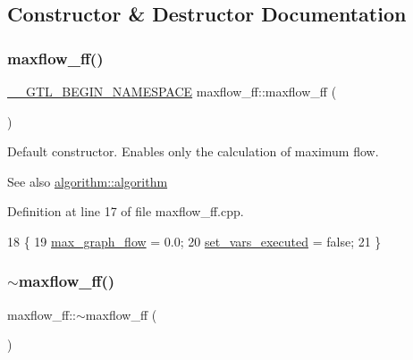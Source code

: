 \subsection{Constructor \& Destructor Documentation}
\mbox{\label{classmaxflow__ff_a6b1d3e5db46a8fcba81e94ad672926ec}} 
\subsubsection{\texorpdfstring{maxflow\+\_\+ff()}{maxflow\_ff()}}
{\footnotesize\ttfamily \mbox{\hyperlink{_g_t_l_8h_a2d9f24096ac60918452dd51f32b64aa9}{\+\_\+\+\_\+\+G\+T\+L\+\_\+\+B\+E\+G\+I\+N\+\_\+\+N\+A\+M\+E\+S\+P\+A\+CE}} maxflow\+\_\+ff\+::maxflow\+\_\+ff (\begin{DoxyParamCaption}{ }\end{DoxyParamCaption})}

Default constructor. Enables only the calculation of maximum flow.

\begin{DoxySeeAlso}{See also}
\mbox{\hyperlink{classalgorithm_ab79e1ddec2f2afdf4b36b10724db8b15}{algorithm\+::algorithm}} 
\end{DoxySeeAlso}


Definition at line 17 of file maxflow\+\_\+ff.\+cpp.


\begin{DoxyCode}
18 \{
19     \mbox{\hyperlink{classmaxflow__ff_a7a2f530f9c95b6f37f4c349427a0f9bb}{max\_graph\_flow}} = 0.0;
20     \mbox{\hyperlink{classmaxflow__ff_a2551a00303d9b81ccc6b3d1f575d7956}{set\_vars\_executed}} = \textcolor{keyword}{false};
21 \}
\end{DoxyCode}
\mbox{\label{classmaxflow__ff_ae1c3c5ba0b8c55cdba429ee906bce7d9}} 
\subsubsection{\texorpdfstring{$\sim$maxflow\+\_\+ff()}{~maxflow\_ff()}}
{\footnotesize\ttfamily maxflow\+\_\+ff\+::$\sim$maxflow\+\_\+ff (\begin{DoxyParamCaption}{ }\end{DoxyParamCaption})\hspace{0.3cm}{\ttfamily [virtual]}}

